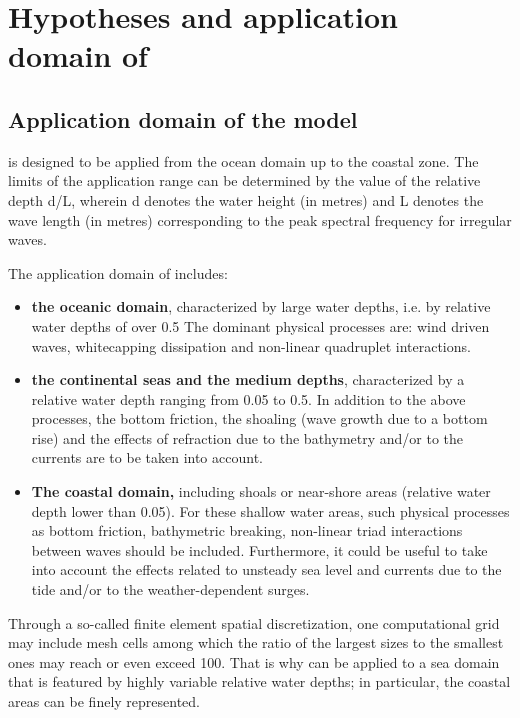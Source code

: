 \chapter{Hypotheses and application domain of \tomawac}


\section{Application domain of the model \tomawac}

 \tomawac is designed to be applied from the ocean domain up to the coastal zone. The limits of the application range can be determined by the value of the relative depth d/L, wherein d denotes the water height (in metres) and L denotes the wave length (in metres) corresponding to the peak spectral frequency for irregular waves.

 The application domain of \tomawac includes:

 \begin{itemize}
\item \textbf{the oceanic domain}, characterized by large water depths, i.e. by relative water depths of over 0.5 The dominant physical processes are: wind driven waves, whitecapping dissipation and non-linear quadruplet interactions.

 \item \textbf{the continental seas and the medium depths}, characterized by a relative water depth ranging from 0.05 to 0.5. In addition to the above processes, the bottom friction, the shoaling (wave growth due to a bottom rise) and the effects of refraction due to the bathymetry and/or to the currents are to be taken into account.

 \item \textbf{The coastal domain, }including shoals or near-shore areas (relative water depth lower than 0.05). For these shallow water areas, such physical processes as bottom friction, bathymetric breaking, non-linear triad interactions between waves should be included. Furthermore, it could be useful to take into account the effects related to unsteady sea level and currents due to the tide and/or to the weather-dependent surges.
\end{itemize}

 Through a so-called finite element spatial discretization, one computational grid may include mesh cells among which the ratio of the largest sizes to the smallest ones may reach or even exceed 100. That is why \tomawac can be applied to a sea domain that is featured by highly variable relative water depths; in particular, the coastal areas can be finely represented.

